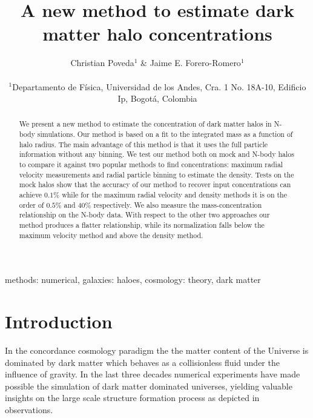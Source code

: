 \documentclass[useAMS,usenatbib]{mn2e}
\begin{document}
\title[A new method for concentrations]{A new method to estimate
  dark matter halo concentrations}
\author[Poveda \& Forero-Romero]{
\parbox[t]{\textwidth}{\raggedright
  Christian Poveda$^{1}$ \&
  Jaime E. Forero-Romero$^{1}$
}
\vspace*{6pt}\\
$^{1}$Departamento de F\'{i}sica, Universidad de los Andes, Cra. 1
No. 18A-10, Edificio Ip, Bogot\'a, Colombia\\
}
\maketitle

\begin{abstract}

We present a new method to estimate the concentration of dark matter
halos in N-body simulations. Our method is based on a fit to the
integrated mass as a function of halo radius.
The main advantage of this method is that it uses the full particle information
without any binning.
We test our method both on mock and N-body halos to compare it against
two popular methods to find concentrations: maximum radial velocity
measurements and radial particle binning to estimate the density.
Tests on the mock halos show that the accuracy of our method to
recover input concentrations can achieve $0.1\%$ while for the maximum
radial velocity and density methods it is on the order of $0.5\%$ and
$40\%$ respectively.
We also measure the mass-concentration relationship on the N-body
data. With respect to the other two approaches our method produces a
flatter relationship, while its normalization falls below the maximum
velocity method and above the density method.



\end{abstract}
\begin{keywords}
methods: numerical, galaxies: haloes, cosmology: theory, dark
matter
\end{keywords}


\section{Introduction}
\label{sec:introduction}
In the concordance cosmology paradigm the the matter content of the
Universe is dominated by dark matter which behaves as a collisionless
fluid under the influence of gravity. In the last three decades
numerical experiments have made possible the simulation of dark matter
dominated universes, yielding valuable insights on the large scale
structure formation process as depicted in observations.
\end{document}
